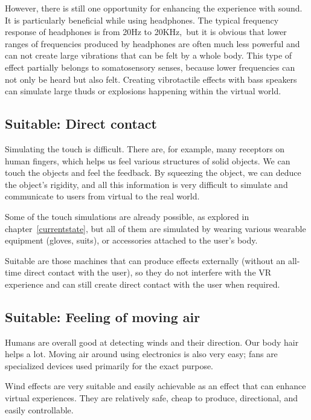 However, there is still one opportunity for enhancing the experience with sound.
It is particularly beneficial while using headphones. The typical frequency
response of headphones is from 20Hz to 20KHz,\,\cite{freqresp} but it is obvious
that lower ranges of frequencies produced by headphones are often much
less powerful and can not create large vibrations that can be felt by a whole
body. This type of effect partially belongs to somatosensory senses, because
lower frequencies can not only be heard but also felt. Creating vibrotactile
effects with bass speakers can simulate large thuds or explosions
happening within the virtual world.

\subsection{Suitable: Direct contact}

Simulating the touch is difficult. There are, for example, many receptors on
human fingers, which helps us feel various structures of solid
objects. We can touch the objects and feel the feedback. By squeezing the
object, we can deduce the object’s rigidity, and all this
information is very difficult to simulate and communicate to users from
virtual to the real world.

Some of the touch simulations are already possible, as explored in chapter~\ref{currentstate}, but all
of them are simulated by wearing various wearable equipment (gloves, suits),
or accessories attached to the user’s body.

Suitable are those machines that can produce effects externally (without an
all-time direct contact with the user), so they do not interfere with the VR
experience and can still create direct contact with the user when required.


\hypertarget{x-suitable:-feeling-of-moving-air}{\subsection{Suitable: Feeling of moving air}}
Humans are overall good at detecting winds and their direction. Our body hair
helps a lot. Moving air around using electronics is also very easy; fans
are specialized devices used primarily for the exact purpose.


Wind effects are very suitable and easily achievable as an effect that can
enhance virtual experiences. They are relatively safe, cheap to produce,
directional, and easily controllable.


